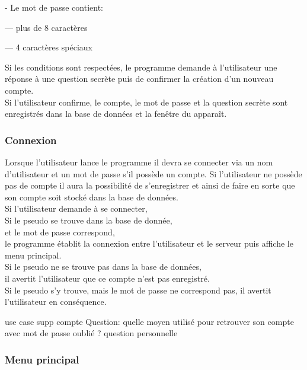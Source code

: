 \documentclass[french, utf8]{article}
\begin{document}
\item- Le mot de passe contient:
\item--- plus de 8 caractères
\item--- 4 caractères spéciaux

Si les conditions sont respectées, le programme
demande à l'utilisateur une réponse à une question secrète puis de confirmer la création d'un
nouveau compte.
\\Si l'utilisateur confirme, le compte, le mot de passe et la question secrète sont enregistrés dans
la base de données et la fenêtre du
 apparaît.

\subsubsection{Connexion}
\label{sec:Connexion}
Lorsque l'utilisateur lance le programme il devra se connecter via un nom d'utilisateur et un mot de passe s'il  possède un compte.
Si l'utilisateur ne possède pas de compte il aura la possibilité de s'enregistrer et ainsi de faire en sorte que son compte soit stocké dans la base de données.
\newline
\\Si l’utilisateur demande à se connecter,
        \\Si le pseudo se trouve dans la base de donnée,
            \\et le mot de passe correspond,
                \\le programme établit la connexion entre l'utilisateur et le serveur
                puis affiche le menu principal.
        \\Si le pseudo ne se trouve pas dans la base de données,
            \\il avertit l'utilisateur que ce compte n'est pas enregistré.
        \\Si le pseudo s'y trouve, mais le mot de passe ne correspond
pas,
            il avertit l'utilisateur en conséquence.
\newline

\newline
use case
supp compte
Question: quelle moyen utilisé pour retrouver son compte avec mot de passe oublié ? question personnelle
\subsubsection{Menu principal}
\label{sec:MenuPrincipalSystem}
\end{document}
